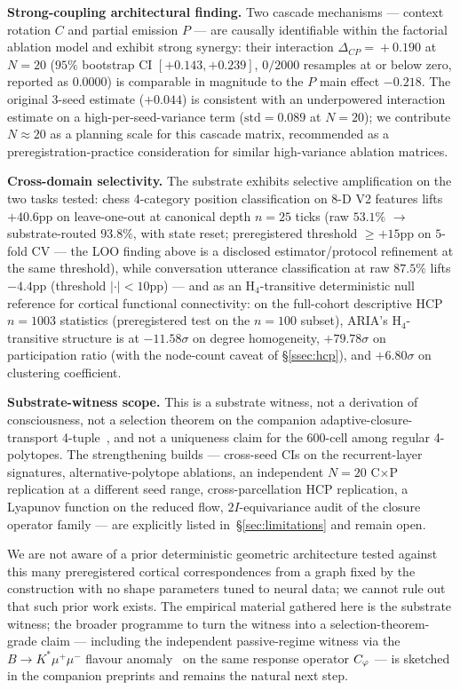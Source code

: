 \textbf{Strong-coupling architectural finding.} Two cascade
mechanisms — context rotation $C$ and partial emission $P$ — are
causally identifiable within the factorial ablation model and exhibit
strong synergy: their interaction $\Delta_{CP}\!=\!+0.190$ at
$N\!=\!20$ ($95\%$ bootstrap CI $[+0.143, +0.239]$, $0/2000$ resamples
at or below zero, reported as $0.0000$) is comparable in magnitude to
the $P$ main effect $-0.218$. The original 3-seed estimate ($+0.044$)
is consistent with an underpowered interaction estimate on a
high-per-seed-variance term ($\mathrm{std}=0.089$ at $N\!=\!20$); we
contribute $N\!\approx\!20$ as a planning scale for this cascade
matrix, recommended as a preregistration-practice consideration for
similar high-variance ablation matrices.

\textbf{Cross-domain selectivity.} The substrate exhibits selective
amplification on the two tasks tested: chess 4-category position
classification on 8-D V2 features lifts $+40.6$pp on leave-one-out at
canonical depth $n\!=\!25$ ticks (raw $53.1\%$ $\to$ substrate-routed
$93.8\%$, with state reset; preregistered threshold $\geq +15$pp on
$5$-fold CV — the LOO finding above is a disclosed estimator/protocol
refinement at the same threshold), while
conversation utterance classification at raw $87.5\%$ lifts $-4.4$pp
(threshold $|\cdot|\!<\!10$pp) — and as an H$_4$-transitive
deterministic null reference for cortical functional connectivity:
on the full-cohort descriptive HCP $n\!=\!1003$ statistics
(preregistered test on the $n\!=\!100$ subset), ARIA's H$_4$-transitive
structure is at $-11.58\sigma$ on degree homogeneity,
$+79.78\sigma$ on participation ratio (with the node-count caveat of
\S\ref{ssec:hcp}), and $+6.80\sigma$ on clustering coefficient.

\textbf{Substrate-witness scope.} This is a substrate witness, not a
derivation of consciousness, not a selection theorem on the
companion adaptive-closure-transport
4-tuple~\citep{SmartAdaptiveClosureTransport2026}, and not a
uniqueness claim for the 600-cell among regular 4-polytopes. The
strengthening builds — cross-seed CIs on the recurrent-layer
signatures, alternative-polytope ablations, an independent $N\!=\!20$
C$\times$P replication at a different seed range, cross-parcellation
HCP replication, a Lyapunov function on the reduced flow,
$2I$-equivariance audit of the closure operator family — are
explicitly listed in~\S\ref{sec:limitations} and remain open.

We are not aware of a prior deterministic geometric architecture
tested against this many preregistered cortical correspondences from
a graph fixed by the construction with no shape parameters tuned to
neural data; we cannot rule out that such prior work exists. The empirical material
gathered here is the substrate witness; the broader programme to
turn the witness into a selection-theorem-grade claim — including the
independent passive-regime witness via the $B\to K^{*}\mu^{+}\mu^{-}$
flavour anomaly~\citep{SmartBAnomaly2026} on the same response
operator $C_{\varphi}$ — is sketched in the companion preprints and remains
the natural next step.
